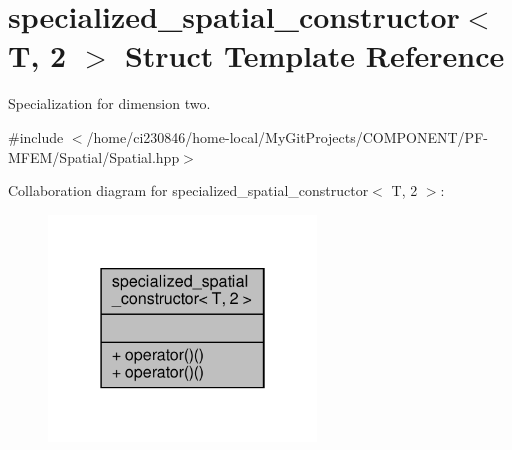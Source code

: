 \hypertarget{structspecialized__spatial__constructor_3_01T_00_012_01_4}{}\section{specialized\+\_\+spatial\+\_\+constructor$<$ T, 2 $>$ Struct Template Reference}
\label{structspecialized__spatial__constructor_3_01T_00_012_01_4}


Specialization for dimension two.  




{\ttfamily \#include $<$/home/ci230846/home-\/local/\+My\+Git\+Projects/\+C\+O\+M\+P\+O\+N\+E\+N\+T/\+P\+F-\/\+M\+F\+E\+M/\+Spatial/\+Spatial.\+hpp$>$}



Collaboration diagram for specialized\+\_\+spatial\+\_\+constructor$<$ T, 2 $>$\+:\nopagebreak
\begin{figure}[H]
\begin{center}
\leavevmode
\includegraphics[width=202pt]{structspecialized__spatial__constructor_3_01T_00_012_01_4__coll__graph}
\end{center}
\end{figure}
